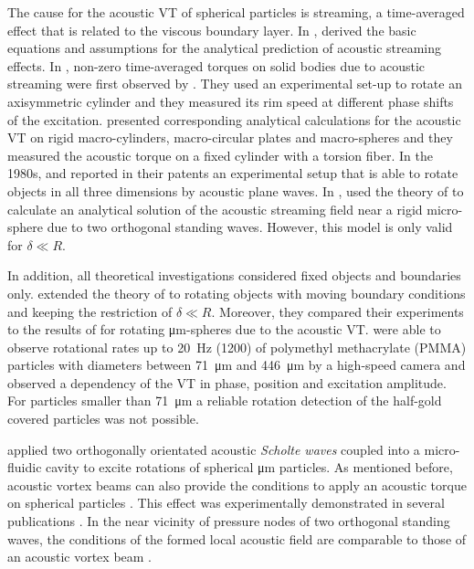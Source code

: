 The cause for the acoustic VT of spherical particles is streaming, a 
time-averaged effect that is related to the viscous boundary layer. In 
\citeyear{Nyborg1958}, \citeauthor{Nyborg1958} \cite{Nyborg1958} derived the basic equations 
and assumptions for the analytical prediction of acoustic streaming effects. In 
\citeyear{Rudnick1977}, non-zero time-averaged torques on solid bodies due to 
acoustic streaming were first observed by \citeauthor{Rudnick1977} \cite{Rudnick1977}. 
They used an experimental set-up to rotate an axisymmetric cylinder and they 
measured its rim speed at different phase shifts of the excitation.  
\citeauthor{Busse1981} \cite{Busse1981} presented corresponding analytical calculations 
for the acoustic VT on rigid macro-cylinders, macro-circular plates and 
macro-spheres and they measured the acoustic torque on a fixed cylinder with a 
torsion fiber. In the 1980s, \citeauthor{Barmatz1983} \cite{Barmatz1983,Barmatz1989} and 
\citeauthor{Elleman1983} \cite{Elleman1983} reported in their patents an experimental setup 
that is able to rotate objects in all three dimensions by acoustic plane waves.  
In \citeyear{Wang1989}, \citeauthor{Wang1989} \cite{Wang1989} used the theory of 
\citeauthor{Nyborg1958} to calculate an analytical solution of the acoustic 
streaming field near a rigid micro-sphere due to two orthogonal standing waves.  
However, this model is only valid for $\delta \ll R$.

In addition, all theoretical investigations considered fixed objects and 
boundaries only.  \citeauthor{Lamprecht2013} \cite{Lamprecht2013} extended the theory of 
\citeauthor{Nyborg1958} to rotating objects with moving boundary conditions and 
keeping the restriction of $\delta \ll R$. Moreover, they compared their 
experiments to the results of \citeauthor{Wang1989} for rotating 
\si{\micro\meter}-spheres due to the acoustic VT\@.  \citeauthor{Lamprecht2013} were 
able to observe rotational rates up to \SI{20}{\hertz} (\SI{1200}{\rpm}) of 
polymethyl methacrylate (PMMA) particles with diameters between 
\SI{71}{\micro\meter} and \SI{446}{\micro\meter} by a high-speed camera and 
observed a dependency of the VT in phase, position and excitation amplitude.  
For particles smaller than \SI{71}{\micro\meter} a reliable rotation detection 
of the half-gold covered particles was not possible.

\citeauthor{Aubert2016} \cite{Aubert2016} applied two orthogonally 
orientated acoustic \emph{Scholte waves} \cite{Cegla2005} coupled into a 
micro-fluidic cavity to excite rotations of spherical \si{\micro\meter} 
particles. As mentioned before, acoustic vortex beams can also provide the 
conditions to apply an acoustic torque on spherical particles 
\cite{Marston2016}. This effect was experimentally demonstrated in 
several publications \cite{Hefner1999, Volke2008, 
Demore2012}. In the near vicinity of pressure nodes of two orthogonal 
standing waves, the conditions of the formed local acoustic field are comparable 
to those of an acoustic vortex beam \cite{Zhang2014}.

